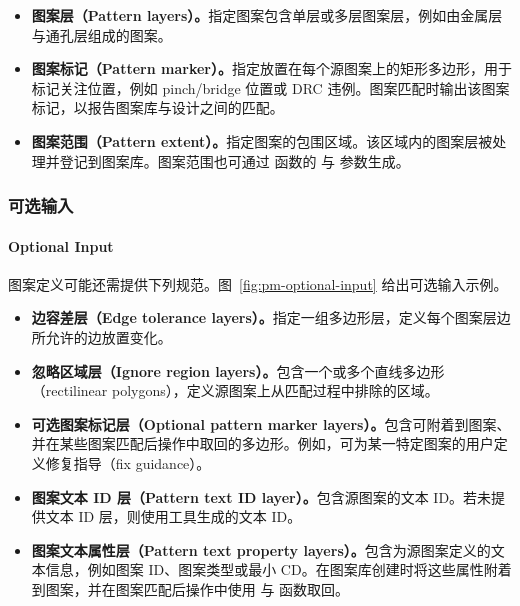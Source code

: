 \begin{itemize}
  \item \textbf{图案层（Pattern layers）。}指定图案包含单层或多层图案层，例如由金属层与通孔层组成的图案。
  \item \textbf{图案标记（Pattern marker）。}指定放置在每个源图案上的矩形多边形，用于标记关注位置，例如 pinch/bridge 位置或 DRC 违例。图案匹配时输出该图案标记，以报告图案库与设计之间的匹配。
  \item \textbf{图案范围（Pattern extent）。}指定图案的包围区域。该区域内的图案层被处理并登记到图案库。图案范围也可通过  函数的  与  参数生成。
\end{itemize}


\subsubsection{可选输入}
\paragraph*{Optional Input}

图案定义可能还需提供下列规范。图~\ref{fig:pm-optional-input} 给出可选输入示例。

\begin{itemize}
  \item \textbf{边容差层（Edge tolerance layers）。}指定一组多边形层，定义每个图案层边所允许的边放置变化。
  \item \textbf{忽略区域层（Ignore region layers）。}包含一个或多个直线多边形（rectilinear polygons），定义源图案上从匹配过程中排除的区域。
  \item \textbf{可选图案标记层（Optional pattern marker layers）。}包含可附着到图案、并在某些图案匹配后操作中取回的多边形。例如，可为某一特定图案的用户定义修复指导（fix guidance）。
  \item \textbf{图案文本 ID 层（Pattern text ID layer）。}包含源图案的文本 ID。若未提供文本 ID 层，则使用工具生成的文本 ID。
  \item \textbf{图案文本属性层（Pattern text property layers）。}包含为源图案定义的文本信息，例如图案 ID、图案类型或最小 CD。在图案库创建时将这些属性附着到图案，并在图案匹配后操作中使用  与  函数取回。
\end{itemize}

